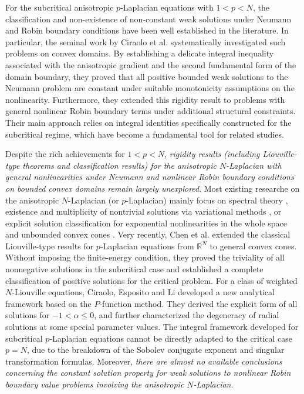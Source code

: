 \documentclass[reqno, 11pt]{amsart} %
\numberwithin{equation}{section}
\theoremstyle{definition}
\begin{document}
For the subcritical anisotropic $p$-Laplacian equations with $1<p<N$, the classification and non-existence of non-constant weak solutions under Neumann and Robin boundary conditions have been well established in the literature. In particular, the seminal work by Ciraolo et al. \cite{CCR2021} systematically investigated such problems on convex domains. By establishing a delicate integral inequality associated with the anisotropic gradient and the second fundamental form of the domain boundary, they proved that all positive bounded weak solutions to the Neumann problem are constant under suitable monotonicity assumptions on the nonlinearity. Furthermore, they extended this rigidity result to problems with general nonlinear Robin boundary terms under additional structural constraints. Their main approach relies on integral identities specifically constructed for the subcritical regime, which have become a fundamental tool for related studies.

Despite the rich achievements for $1<p<N$, \textit{rigidity results (including Liouville-type theorems and classification results)  for the anisotropic $N$-Laplacian with general nonlinearities under Neumann and nonlinear Robin boundary conditions on bounded convex domains remain largely unexplored}. Most existing researche on the anisotropic $N$-Laplacian (or $p$-Laplacian) mainly focus on spectral theory \cite{PPS}, existence and multiplicity of nontrivial solutions via variational methods  \cite{FH, GL2005}, or explicit solution classification for exponential nonlinearities in the whole space \cite{CL2024} and unbounded convex cones \cite{DGL}. Very recently, Chen et al. \cite{CDGL2026} extended the classical Liouville-type results for $p$-Laplacian equations from $\mathbb{R}^N$ to general convex cones. Without imposing the finite-energy condition, they proved the triviality of all nonnegative solutions in the subcritical case and established a complete classification of positive solutions for the critical problem. For a class of weighted $N$-Liouville equations, Ciraolo, Esposito and Li \cite{CEL} developed a new analytical framework based on the $P$-function method. They derived the explicit form of all solutions for $-1<\alpha\leq 0$, and further characterized the degeneracy of radial solutions at some special parameter values.
The integral framework developed for subcritical $p$-Laplacian equations cannot be directly adapted to the critical case $p=N$, due to the breakdown of the Sobolev conjugate exponent and singular transformation formulas. Moreover, \textit{there are almost no available conclusions concerning the constant solution property for weak solutions to nonlinear Robin boundary value problems involving the anisotropic $N$-Laplacian}.
\end{document}
